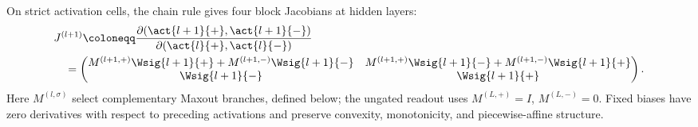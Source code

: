 On strict activation cells, the chain rule gives four block Jacobians at hidden layers:
\begin{equation}
\begin{aligned}
&J^{(l+1)}\coloneqq\frac{\partial(\act{l+1}{+},\act{l+1}{-})}{\partial(\act{l}{+},\act{l}{-})}\\
&\quad=\begin{pmatrix}
M^{(l+1,+)}\Wsig{l+1}{+}+M^{(l+1,-)}\Wsig{l+1}{-}
& M^{(l+1,+)}\Wsig{l+1}{-}+M^{(l+1,-)}\Wsig{l+1}{+}\\
\Wsig{l+1}{-} & \Wsig{l+1}{+}
\end{pmatrix}.
\end{aligned}
\label{eq:split_layer_jacobians}
\end{equation}
Here $M^{(l,\sigma)}$ select complementary Maxout branches, defined below; the ungated readout uses $M^{(L,+)}=I$, $M^{(L,-)}=0$. Fixed biases have zero derivatives with respect to preceding activations and preserve convexity, monotonicity, and piecewise-affine structure.

